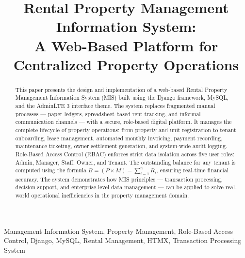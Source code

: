 \documentclass[conference]{IEEEtran}
\begin{document}

\title{Rental Property Management Information System:\\
A Web-Based Platform for Centralized Property Operations}

\author{
    \and
}

\maketitle

\begin{abstract}
This paper presents the design and implementation of a web-based Rental Property Management Information System (MIS) built using the Django framework, MySQL, and the AdminLTE 3 interface theme. The system replaces fragmented manual processes — paper ledgers, spreadsheet-based rent tracking, and informal communication channels — with a secure, role-based digital platform. It manages the complete lifecycle of property operations: from property and unit registration to tenant onboarding, lease management, automated monthly invoicing, payment recording, maintenance ticketing, owner settlement generation, and system-wide audit logging. Role-Based Access Control (RBAC) enforces strict data isolation across five user roles: Admin, Manager, Staff, Owner, and Tenant. The outstanding balance for any tenant is computed using the formula $B = (P \times M) - \sum_{i=1}^{n} R_i$, ensuring real-time financial accuracy. The system demonstrates how MIS principles — transaction processing, decision support, and enterprise-level data management — can be applied to solve real-world operational inefficiencies in the property management domain.
\end{abstract}

\begin{IEEEkeywords}
Management Information System, Property Management, Role-Based Access Control, Django, MySQL, Rental Management, HTMX, Transaction Processing System
\end{IEEEkeywords}
\end{document}
